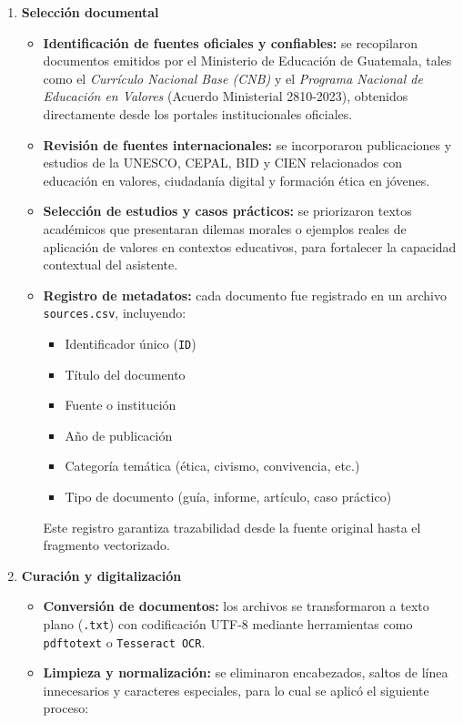\begin{enumerate}

      \item \textbf{Selección documental}
            \begin{itemize}
                  \item \textbf{Identificación de fuentes oficiales y confiables:} se recopilaron documentos emitidos por el Ministerio de Educación de Guatemala, tales como el \textit{Currículo Nacional Base (CNB)} y el \textit{Programa Nacional de Educación en Valores} (Acuerdo Ministerial 2810-2023), obtenidos directamente desde los portales institucionales oficiales.
                  \item \textbf{Revisión de fuentes internacionales:} se incorporaron publicaciones y estudios de la UNESCO, CEPAL, BID y CIEN relacionados con educación en valores, ciudadanía digital y formación ética en jóvenes.
                  \item \textbf{Selección de estudios y casos prácticos:} se priorizaron textos académicos que presentaran dilemas morales o ejemplos reales de aplicación de valores en contextos educativos, para fortalecer la capacidad contextual del asistente.
                  \item \textbf{Registro de metadatos:} cada documento fue registrado en un archivo \texttt{sources.csv}, incluyendo:
                        \begin{itemize}
                              \item Identificador único (\texttt{ID})
                              \item Título del documento
                              \item Fuente o institución
                              \item Año de publicación
                              \item Categoría temática (ética, civismo, convivencia, etc.)
                              \item Tipo de documento (guía, informe, artículo, caso práctico)
                        \end{itemize}
                        Este registro garantiza trazabilidad desde la fuente original hasta el fragmento vectorizado.
            \end{itemize}

      \item \textbf{Curación y digitalización}
            \begin{itemize}
                  \item \textbf{Conversión de documentos:} los archivos se transformaron a texto plano (\texttt{.txt}) con codificación UTF-8 mediante herramientas como \texttt{pdftotext} o \texttt{Tesseract OCR}.
                  \item \textbf{Limpieza y normalización:} se eliminaron encabezados, saltos de línea innecesarios y caracteres especiales, para lo cual se aplicó el siguiente proceso:


\end{itemize}
\end{enumerate}
